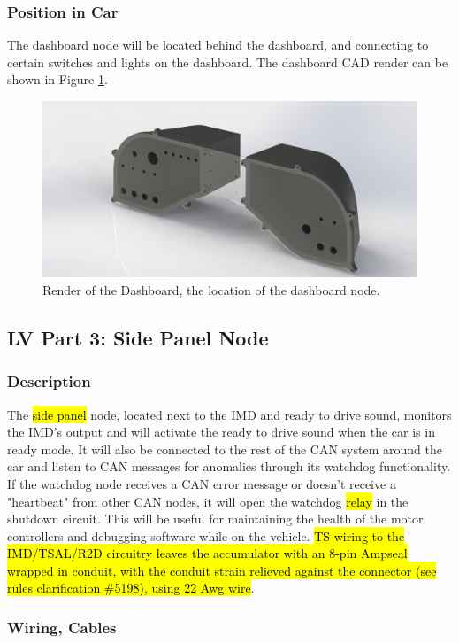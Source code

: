\documentclass{article}
\DeclareRobustCommand{\hlr}[1]{{\sethlcolor{red}\hl{#1}}}
\begin{document}
        \subsubsection{Position in Car}

            The dashboard node will be located behind the dashboard, and connecting to certain switches and lights on the dashboard. The dashboard CAD render can be shown in Figure \ref{dashboardCAD}.

            \begin{figure}[H]
            \centering
            \includegraphics[width = 0.4 \textwidth]{Dashboard}
            \caption{Render of the Dashboard, the location of the dashboard node. }
            \label{dashboardCAD}
            \end{figure}

    \subsection{LV Part 3: Side Panel Node} \label{imdnode}

        \subsubsection{Description}

            The \hlr{side panel} node, located next to the IMD and ready to drive sound, monitors the IMD's output and will activate the ready to drive sound when the car is in ready mode. It will also be connected to the rest of the CAN system around the car and listen to CAN messages for anomalies through its watchdog functionality. If the watchdog node receives a CAN error message or doesn't receive a "heartbeat" from other CAN nodes, it will open the watchdog \hlr{relay} in the shutdown circuit. This will be useful for maintaining the health of the motor controllers and debugging software while on the vehicle. \hlr{TS wiring to the IMD/TSAL/R2D circuitry leaves the accumulator with an 8-pin Ampseal wrapped in conduit, with the conduit strain relieved against the connector (see rules clarification \#5198), using 22 Awg wire}.


        \subsubsection{Wiring, Cables}
\end{document}
